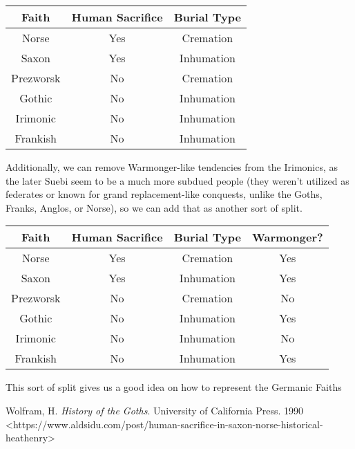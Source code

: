 \documentclass{article}
\begin{document}
	\begin{tabular}{|c|c|c|}
		\hline
		Faith & Human Sacrifice & Burial Type\\
		\hline
		Norse & Yes & Cremation\\
		Saxon & Yes & Inhumation\\
		Prezworsk & No & Cremation\\
		Gothic & No & Inhumation\\
		Irimonic & No & Inhumation\\
		Frankish & No & Inhumation\\
		\hline
	\end{tabular}

	Additionally, we can remove Warmonger-like tendencies from the Irimonics, as the later Suebi seem to be a much more subdued people (they weren't utilized as federates or known for grand replacement-like conquests, unlike the Goths, Franks, Anglos, or Norse), so we can add that as another sort of split.
	
	\begin{tabular}{|c|c|c|c|}
		\hline
		Faith & Human Sacrifice & Burial Type & Warmonger? \\
		\hline
		Norse & Yes & Cremation & Yes\\
		Saxon & Yes & Inhumation & Yes\\
		Prezworsk & No & Cremation & No\\
		Gothic & No & Inhumation & Yes\\
		Irimonic & No & Inhumation & No\\
		Frankish & No & Inhumation & Yes\\
		\hline
	\end{tabular}
	
	This sort of split gives us a good idea on how to represent the Germanic Faiths
	
	\begin{thebibliography}{99}
	Wolfram, H. \textit{History of the Goths}. University of California Press. 1990
	<https://www.aldsidu.com/post/human-sacrifice-in-saxon-norse-historical-heathenry>
\end{thebibliography}
\end{document}
